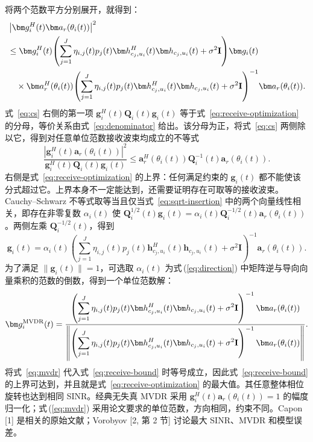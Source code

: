 将两个范数平方分别展开，就得到：
\begin{align}
&\left|\bm g_i^H(t)\bm a_r(\theta_i(t))\right|^2\notag\\
&\le\bm g_i^H(t)\!\left(\sum_{j=1}^J\eta_{i,j}(t)p_j(t)
\bm h_{c_j,u_i}^{H}(t)\bm h_{c_j,u_i}(t)+\sigma^2\mathbf I\right)\!\bm g_i(t)\notag\\
&\quad\times\bm a_r^H(\theta_i(t))\!\left(\sum_{j=1}^J\eta_{i,j}(t)p_j(t)
\bm h_{c_j,u_i}^{H}(t)\bm h_{c_j,u_i}(t)+\sigma^2\mathbf I\right)^{-1}\!\bm a_r(\theta_i(t)).\label{eq:cs}
\end{align}
式~\eqref{eq:cs} 右侧的第一项 $\bm g_i^H(t)\mathbf Q_i(t)\bm g_i(t)$ 等于式~\eqref{eq:receive-optimization} 的分母，等价关系由式~\eqref{eq:denominator} 给出。该分母为正，将式~\eqref{eq:cs} 两侧除以它，得到对任意单位范数接收波束均成立的不等式
\begin{equation}\label{eq:receive-bound}
\frac{|\bm g_i^H(t)\bm a_r(\theta_i(t))|^2}{\bm g_i^H(t)\mathbf Q_i(t)\bm g_i(t)}
\le\bm a_r^H(\theta_i(t))\mathbf Q_i^{-1}(t)\bm a_r(\theta_i(t)).
\end{equation}
右侧是式~\eqref{eq:receive-optimization} 的上界：任何满足约束的 $\bm g_i(t)$ 都不能使该分式超过它。上界本身不一定能达到，还需要证明存在可取等的接收波束。Cauchy--Schwarz 不等式取等当且仅当式~\eqref{eq:sqrt-insertion} 中的两个向量线性相关，即存在非零复数 $\alpha_i(t)$ 使 $\mathbf Q_i^{1/2}(t)\bm g_i(t)=\alpha_i(t)\mathbf Q_i^{-1/2}(t)\bm a_r(\theta_i(t))$。两侧左乘 $\mathbf Q_i^{-1/2}(t)$，得到
\begin{equation}\label{eq:direction}
\bm g_i(t)=\alpha_i(t)\left(\sum_{j=1}^J\eta_{i,j}(t)p_j(t)
\bm h_{c_j,u_i}^{H}(t)\bm h_{c_j,u_i}(t)+\sigma^2\mathbf I\right)^{-1}
\bm a_r(\theta_i(t)).
\end{equation}
为了满足 $\|\bm g_i(t)\|=1$，可选取 $\alpha_i(t)$ 为式\,(\ref{eq:direction}) 中矩阵逆与导向向量乘积的范数的倒数，得到一个单位范数解：
\begin{equation}\label{eq:mvdr}
\bm g_i^{\rm MVDR}(t)=
\frac{\left(\displaystyle\sum_{j=1}^J\eta_{i,j}(t)p_j(t)
\bm h_{c_j,u_i}^{H}(t)\bm h_{c_j,u_i}(t)+\sigma^2\mathbf I\right)^{-1}
\bm a_r(\theta_i(t))}
{\left\|\left(\displaystyle\sum_{j=1}^J\eta_{i,j}(t)p_j(t)
\bm h_{c_j,u_i}^{H}(t)\bm h_{c_j,u_i}(t)+\sigma^2\mathbf I\right)^{-1}
\bm a_r(\theta_i(t))\right\|}.
\end{equation}
将式~\eqref{eq:mvdr} 代入式~\eqref{eq:receive-bound} 时等号成立，因此式~\eqref{eq:receive-bound} 的上界可达到，并且就是式~\eqref{eq:receive-optimization} 的最大值。其任意整体相位旋转也达到相同 SINR。经典无失真 MVDR 采用 $\bm g_i^H(t)\bm a_r(\theta_i(t))=1$ 的幅度归一化；式\,(\ref{eq:mvdr}) 采用论文要求的单位范数，方向相同，约束不同。Capon [1] 是相关的原始文献；Vorobyov [2, 第 2 节] 讨论最大 SINR、MVDR 和模型误差。

